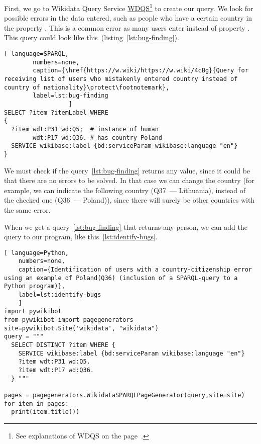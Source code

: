 First, we go to Wikidata Query Service \href{https://query.wikidata.org/}{WDQS}\footnote{%
See explanations of WDQS on the page~\pageref{sect:WDQS}.%
}%
 to create our query. 
We look for possible errors in the data entered, such as people who have a certain country in the property .
This is a common error as many users enter  instead of property .
This query could look like this~(listing~\ref{lst:bug-finding}).

\begin{lstlisting}[ language=SPARQL,
        numbers=none,
        caption={\href{https://w.wiki/https://w.wiki/4cBg}{Query for receiving list of users who mistakenly entered country instead of country of nationality}\protect\footnotemark},
        label=lst:bug-finding
                  ]
SELECT ?item ?itemLabel WHERE 
{
  ?item wdt:P31 wd:Q5;  # instance of human
        wdt:P17 wd:Q36. # has country Poland
  SERVICE wikibase:label {bd:serviceParam wikibase:language "en"}
}
\end{lstlisting}

We must check if the query~\ref{lst:bug-finding} returns any value,
since it could be that there are no errors to be solved. 
In that case we can change the country 
(for example, we can indicate the following country (Q37~--- Lithuania), instead of the checked one (Q36~--- Poland)), 
since there will surely be other countries with the same error.

When we get a query~\ref{lst:bug-finding} that returns any person, 
we can add the query to our program, like this~\ref{lst:identify-bugs}.

\begin{lstlisting}[ language=Python,
    numbers=none,
    caption={Identification of users with a country-citizenship error using an example of Poland(Q36) (inclusion of a SPARQL-query to a Python program)},
    label=lst:identify-bugs
    ]
import pywikibot
from pywikibot import pagegenerators
site=pywikibot.Site('wikidata', "wikidata")
query = """
  SELECT DISTINCT ?item WHERE {
    SERVICE wikibase:label {bd:serviceParam wikibase:language "en"}
    ?item wdt:P31 wd:Q5.
    ?item wdt:P17 wd:Q36.
  } """

pages = pagegenerators.WikidataSPARQLPageGenerator(query,site=site)
for item in pages:
  print(item.title())
\end{lstlisting}    

